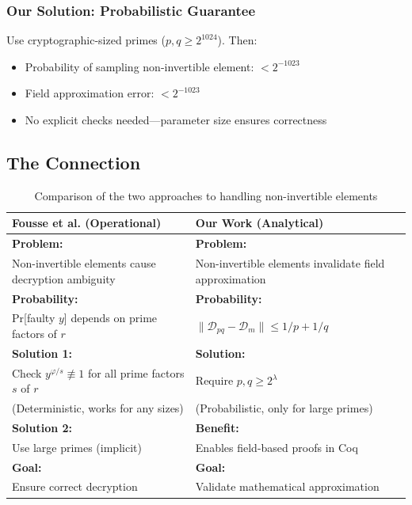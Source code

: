 \documentclass[11pt]{article}
\theoremstyle{definition}
\begin{document}
\subsubsection{Our Solution: Probabilistic Guarantee}

Use cryptographic-sized primes ($p, q \geq 2^{1024}$). Then:
\begin{itemize}
\item Probability of sampling non-invertible element: $< 2^{-1023}$
\item Field approximation error: $< 2^{-1023}$
\item No explicit checks needed—parameter size ensures correctness
\end{itemize}

\subsection{The Connection}

\begin{table}[h]
\centering
\begin{tabular}{@{}p{}p{}@{}}
\toprule
\textbf{Fousse et al. (Operational)} & \textbf{Our Work (Analytical)} \\ 
\midrule
\textbf{Problem:} & \textbf{Problem:} \\
Non-invertible elements cause decryption ambiguity & Non-invertible elements invalidate field approximation \\[0.5em]

\textbf{Probability:} & \textbf{Probability:} \\
Pr[faulty $y$] depends on prime factors of $r$ & $\|\mathcal{D}_{pq} - \mathcal{D}_m\| \leq 1/p + 1/q$ \\[0.5em]

\textbf{Solution 1:} & \textbf{Solution:} \\
Check $y^{\varphi/s} \not\equiv 1$ for all prime factors $s$ of $r$ & Require $p, q \geq 2^\lambda$ \\
(Deterministic, works for any sizes) & (Probabilistic, only for large primes) \\[0.5em]

\textbf{Solution 2:} & \textbf{Benefit:} \\
Use large primes (implicit) & Enables field-based proofs in Coq \\[0.5em]

\textbf{Goal:} & \textbf{Goal:} \\
Ensure correct decryption & Validate mathematical approximation \\
\bottomrule
\end{tabular}
\caption{Comparison of the two approaches to handling non-invertible elements}
\end{table}
\end{document}
